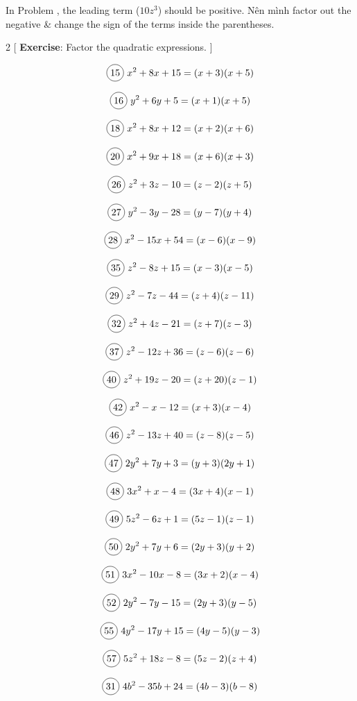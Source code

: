 In Problem , the leading term ($10z^{3}$) should be positive. Nên mình factor out the negative \& change the sign of the terms inside the parentheses.

\vspace{.6cm}

\begin{multicols}{2}
[
  \textbf{Exercise}: Factor the quadratic expressions.
]

\begin{align*}
  \circled{15}\ &x^{2}+8x+15=(x+3)(x+5)\\
\end{align*}

  \[\circled{16}\ y^{2}+6y+5=(x+1)(x+5)\]

  \[\circled{18}\ x^{2}+8x+12=(x+2)(x+6)\]

  \[\circled{20}\ x^{2}+9x+18=(x+6)(x+3)\]

  \[\circled{26}\ z^{2}+3z-10=(z-2)(z+5)\]

  \[\circled{27}\ y^{2}-3y-28=(y-7)(y+4)\]

  \[\circled{28}\ x^{2}-15x+54=(x-6)(x-9)\]

  \[\circled{35}\ z^{2}-8z+15=(x-3)(x-5)\]

  \[\circled{29}\ z^{2}-7z-44=(z+4)(z-11)\]

  \[\circled{32}\ z^{2}+4z-21=(z+7)(z-3)\]

  \[\circled{37}\ z^{2}-12z+36=(z-6)(z-6)\]

  \[\circled{40}\ z^{2}+19z-20=(z+20)(z-1)\]

  \[\circled{42}\ x^{2}-x-12=(x+3)(x-4)\]

  \[\circled{46}\ z^{2}-13z+40=(z-8)(z-5)\]

  \[\circled{47}\ 2y^{2}+7y+3=(y+3)(2y+1)\]

  \[\circled{48}\ 3x^{2}+x-4=(3x+4)(x-1)\]

  \[\circled{49}\ 5z^{2}-6z+1=(5z-1)(z-1)\]

  \[\circled{50}\ 2y^{2}+7y+6=(2y+3)(y+2)\]

  \[\circled{51}\ 3x^{2}-10x-8=(3x+2)(x-4)\]

  \[\circled{52}\ 2y^{2}-7y-15=(2y+3)(y-5)\]

  \[\circled{55}\ 4y^{2}-17y+15=(4y-5)(y-3)\]

  \[\circled{57}\ 5z^{2}+18z-8=(5z-2)(z+4)\]

  \[\circled{31}\ 4b^{2}-35b+24=(4b-3)(b-8)\]
\end{multicols}

